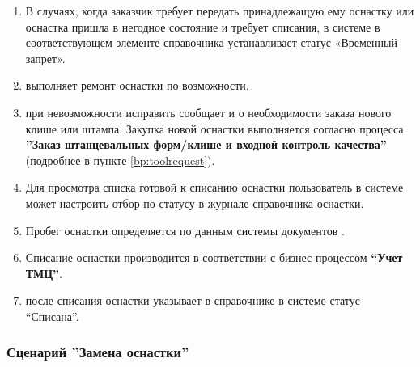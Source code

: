 \begin{enumerate}
\item	В случаях, когда заказчик требует передать принадлежащую ему оснастку или оснастка пришла в негодное состояние и требует списания, \preproductionspecialist в системе \gofro в соответствующем элементе справочника  устанавливает статус «Временный запрет».
\item \operator выполняет ремонт оснастки по возможности.
\item \operator при невозможности исправить  сообщает \preproductionspecialist  и \constructor о необходимости заказа
нового клише или штампа. Закупка новой оснастки выполняется согласно процесса \textbf{''Заказ штанцевальных форм/клише и входной контроль качества''} (подробнее в пункте \ref{bp:toolrequest}).
\item	Для просмотра списка готовой к списанию оснастки пользователь в системе \gofro может настроить отбор по статусу в журнале справочника оснастки.
\item Пробег оснастки определяется по данным системы \gofro документов .
\item	Списание оснастки производится в соответствии с бизнес-процессом \textbf{“Учет ТМЦ”}.
\item	\preproductionspecialist после списания оснастки  указывает в справочнике  в системе \gofro статус “Списана”.

\end{enumerate}


\subsubsection{Сценарий ''Замена оснастки''}
\label{bp:tool_3}


